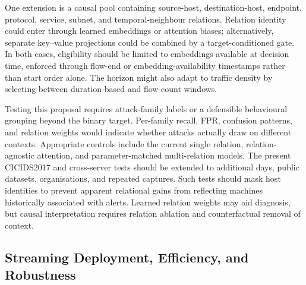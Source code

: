 \documentclass[11pt,fleqn]{report}
\begin{document}
One extension is a causal pool containing source-host, destination-host, endpoint, protocol, service, subnet, and temporal-neighbour relations. Relation identity could enter through learned embeddings or attention biases; alternatively, separate key--value projections could be combined by a target-conditioned gate. In both cases, eligibility should be limited to embeddings available at decision time, enforced through flow-end or embedding-availability timestamps rather than start order alone. The horizon might also adapt to traffic density by selecting between duration-based and flow-count windows.

Testing this proposal requires attack-family labels or a defensible behavioural grouping beyond the binary target. Per-family recall, FPR, confusion patterns, and relation weights would indicate whether attacks actually draw on different contexts. Appropriate controls include the current single relation, relation-agnostic attention, and parameter-matched multi-relation models. The present CICIDS2017 and cross-server tests should be extended to additional days, public datasets, organisations, and repeated captures. Such tests should mask host identities to prevent apparent relational gains from reflecting machines historically associated with alerts. Learned relation weights may aid diagnosis, but causal interpretation requires relation ablation and counterfactual removal of context.



\subsection{Streaming Deployment, Efficiency, and Robustness}
\label{subsubsec:future_streaming_deployment}
\end{document}
